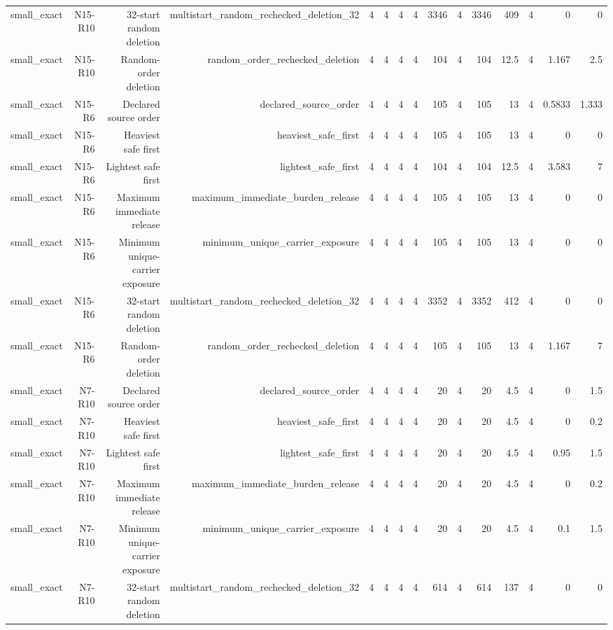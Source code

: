 {\begin{longtable}{lrrrrrrrrrrrrrr}
small\_exact & N15-R10 & 32-start random deletion & multistart\_random\_rechecked\_deletion\_32 & 4 & 4 & 4 & 4 & 3346 & 4 & 3346 & 409 & 4 & 0 & 0 \\
small\_exact & N15-R10 & Random-order deletion & random\_order\_rechecked\_deletion & 4 & 4 & 4 & 4 & 104 & 4 & 104 & 12.5 & 4 & 1.167 & 2.5 \\
small\_exact & N15-R6 & Declared source order & declared\_source\_order & 4 & 4 & 4 & 4 & 105 & 4 & 105 & 13 & 4 & 0.5833 & 1.333 \\
small\_exact & N15-R6 & Heaviest safe first & heaviest\_safe\_first & 4 & 4 & 4 & 4 & 105 & 4 & 105 & 13 & 4 & 0 & 0 \\
small\_exact & N15-R6 & Lightest safe first & lightest\_safe\_first & 4 & 4 & 4 & 4 & 104 & 4 & 104 & 12.5 & 4 & 3.583 & 7 \\
small\_exact & N15-R6 & Maximum immediate release & maximum\_immediate\_burden\_release & 4 & 4 & 4 & 4 & 105 & 4 & 105 & 13 & 4 & 0 & 0 \\
small\_exact & N15-R6 & Minimum unique-carrier exposure & minimum\_unique\_carrier\_exposure & 4 & 4 & 4 & 4 & 105 & 4 & 105 & 13 & 4 & 0 & 0 \\
small\_exact & N15-R6 & 32-start random deletion & multistart\_random\_rechecked\_deletion\_32 & 4 & 4 & 4 & 4 & 3352 & 4 & 3352 & 412 & 4 & 0 & 0 \\
small\_exact & N15-R6 & Random-order deletion & random\_order\_rechecked\_deletion & 4 & 4 & 4 & 4 & 105 & 4 & 105 & 13 & 4 & 1.167 & 7 \\
small\_exact & N7-R10 & Declared source order & declared\_source\_order & 4 & 4 & 4 & 4 & 20 & 4 & 20 & 4.5 & 4 & 0 & 1.5 \\
small\_exact & N7-R10 & Heaviest safe first & heaviest\_safe\_first & 4 & 4 & 4 & 4 & 20 & 4 & 20 & 4.5 & 4 & 0 & 0.2 \\
small\_exact & N7-R10 & Lightest safe first & lightest\_safe\_first & 4 & 4 & 4 & 4 & 20 & 4 & 20 & 4.5 & 4 & 0.95 & 1.5 \\
small\_exact & N7-R10 & Maximum immediate release & maximum\_immediate\_burden\_release & 4 & 4 & 4 & 4 & 20 & 4 & 20 & 4.5 & 4 & 0 & 0.2 \\
small\_exact & N7-R10 & Minimum unique-carrier exposure & minimum\_unique\_carrier\_exposure & 4 & 4 & 4 & 4 & 20 & 4 & 20 & 4.5 & 4 & 0.1 & 1.5 \\
small\_exact & N7-R10 & 32-start random deletion & multistart\_random\_rechecked\_deletion\_32 & 4 & 4 & 4 & 4 & 614 & 4 & 614 & 137 & 4 & 0 & 0 \\

\end{longtable}}
